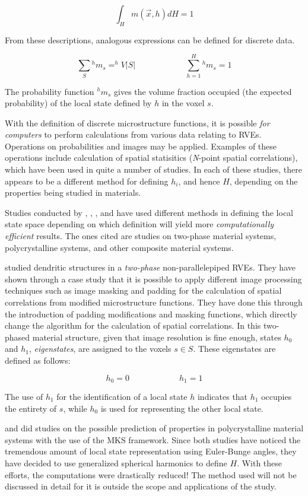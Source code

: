 \[
  \int_H m(\vec{x}, h)dH = 1
\]

From these descriptions, analogous expressions can be defined for discrete data.

\[
  \sum_{S} {^hm_s} = ^hV\lvert S\rvert \hspace{1in}
  \sum_{h=1}^{H} {^hm_s} = 1
\]

The probability function $^hm_s$ gives the volume fraction occupied (the expected probability) of the local state defined by $h$ in the voxel $s$.

With the definition of discrete microstructure functions, it is possible \emph{for computers} to perform calculations from various data relating to RVEs.
Operations on probabilities and images may be applied.
Examples of these operations include calculation of spatial statisitics (\textit{N}-point spatial correlations), which have been used in quite a number of studies.
In each of these studies, there appears to be a different method for defining $h_i$, and hence $H$, depending on the properties being studied in materials.

Studies conducted by , , , and  have used different methods in defining the local state space depending on which definition will yield more \emph{computationally efficient} results.
The ones cited are studies on two-phase material systems, polycrystalline systems, and other composite material systems.

 studied dendritic structures in a \emph{two-phase} non-parallelepiped RVEs.
They have shown through a case study that it is possible to apply different image processing techniques such as image masking and padding for the calculation of spatial correlations from modified microstructure functions.
They have done this through the introduction of padding modifications and masking functions, which directly change the algorithm for the calculation of spatial correlations.
In this two-phased material structure, given that image resolution is fine enough, states $h_0$ and $h_1$, \emph{eigenstates}, are assigned to the voxels $s \in S$.
These eigenstates are defined as follows:

\[
  h_0 = 0 \hspace{1in}
  h_1 = 1
\]

The use of $h_1$ for the identification of a local state $h$ indicates that $h_1$ occupies the entirety of $s$, while $h_0$ is used for representing the other local state.

 and  did studies on the possible prediction of properties in polycrystalline material systems with the use of the MKS framework.
Since both studies have noticed the tremendous amount of local state representation using Euler-Bunge angles, they have decided to use generalized spherical harmonics to define $H$.
With these efforts, the computations were drastically reduced!
The method used will not be discussed in detail for it is outside the scope and applications of the study.

